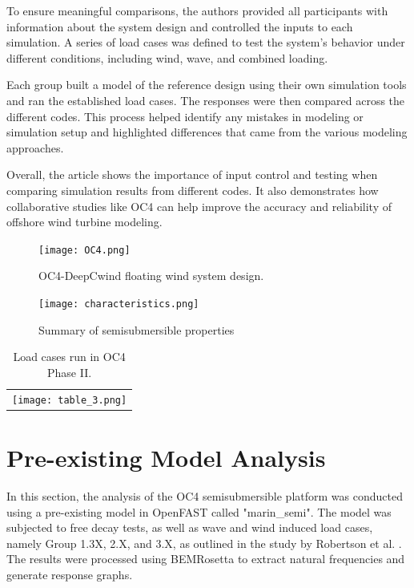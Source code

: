 \documentclass[a4paper, 11pt]{article}
\begin{document}
To ensure meaningful comparisons, the authors provided all participants with information about the system design and controlled the inputs to each simulation. A series of load cases was defined to test the system’s behavior under different conditions, including wind, wave, and combined loading.

Each group built a model of the reference design using their own simulation tools and ran the established load cases. The responses were then compared across the different codes. This process helped identify any mistakes in modeling or simulation setup and highlighted differences that came from the various modeling approaches.

Overall, the article shows the importance of input control and testing when comparing simulation results from different codes. It also demonstrates how collaborative studies like OC4 can help improve the accuracy and reliability of offshore wind turbine modeling.
\vspace{0.5cm}

\begin{figure}[H]
    \begin{minipage}{0.47\textwidth}
        \centering
        \texttt{[image: OC4.png]}
        \caption{\small OC4-DeepCwind floating wind system design. \cite{Robertson2014}}
        \label{fig:OC4}
    \end{minipage}
    \hfill
    \begin{minipage}{0.5\textwidth}
        \centering
        \texttt{[image: characteristics.png]}
        \caption{\small Summary of semisubmersible properties \cite{Robertson2014}}
        \label{fig:characteristics}
    \end{minipage}
\end{figure}

\begin{table}[H]
    \centering
    \caption{Load cases run in OC4 Phase II. \cite{Robertson2014}}
    \label{tab:image_table}
    \begin{tabular}{c}
        \texttt{[image: table\_3.png]} \\
    \end{tabular}
\end{table}


\section{Pre-existing Model Analysis}

\hspace*{0.5cm}In this section, the analysis of the OC4 semisubmersible platform was conducted using a pre-existing model in OpenFAST called "marin\_semi". The model was subjected to free decay tests, as well as  wave and wind induced load cases, namely Group 1.3X, 2.X, and 3.X, as outlined in the study by Robertson et al. \cite{Robertson2014}. The results were processed using BEMRosetta to extract natural frequencies and generate response graphs.
\end{document}
